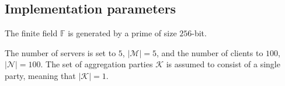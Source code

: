 



\subsection*{Implementation parameters}
The finite field $\mathds{F}$ is generated by a prime of size $256$-bit.

The number of servers is set to $5$, $|\mathcal{M}|=5$,  and the number of clients to $100$, $|\mathcal{N}|=100$.  The set of aggregation parties $\mathcal{K}$ is assumed to consist of a single party, meaning that $|\mathcal{K}|=1$.


